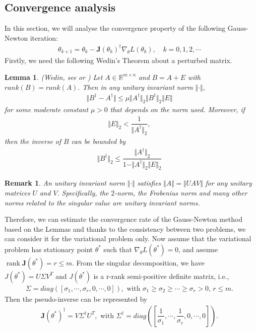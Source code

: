 \documentclass[a4paper, 11pt]{article}
\numberwithin{equation}{section}
\newtheorem{lemma}{\textbf{Lemma}}
\newtheorem{remark}{\textbf{Remark}}
\begin{document}
\subsection{Convergence analysis}
\quad\quad In this section, we will analyse the convergence property of the following Gauss-Newton iteration:
\begin{align}\label{pvarIter}
\theta_{k+1} = \theta_k - \boldsymbol{J} (\theta_k)^{\dagger}  \nabla_{\theta}L(\theta_k), \quad k=0,1,2,\cdots
\end{align}
Firstly, we need the following Wedin's Theorem about a perturbed matrix.

\begin{lemma}\label{lemma5} (Wedin, see \cite{Wedin1973} or \cite{Nieves2016})
Let $A\in \mathbb{R}^{m\times n}$ and $B = A+E$ with $rank(B) = rank(A)$. Then in any unitary invariant norm $\Vert \cdot \Vert$,
\begin{align}\label{lemma5one}
\Vert B^{\dagger} - A^{\dagger} \Vert \leq \mu \Vert A^{\dagger} \Vert_2 \Vert B^{\dagger} \Vert_2 \Vert E \Vert
\end{align}
for some moderate constant $\mu > 0$ that depends on the norm used. Moreover, if
\begin{align}\label{lemma5two}
\Vert E \Vert_2 < \dfrac{1}{\Vert A^{\dagger} \Vert_2},
\end{align} 
then the inverse of $B$ can be bounded by
\begin{align}\label{lemma5three}
\Vert B^{\dagger} \Vert_2 \leq \dfrac{\Vert A^{\dagger} \Vert_2}{1-\Vert A^{\dagger} \Vert_2\Vert E \Vert_2}
\end{align}
\end{lemma}

\begin{remark}
An unitary invariant norm $\Vert \cdot \Vert$ satisfies $\Vert A \Vert = \Vert UAV \Vert$ for any unitary matrices $U$ and $V$. Specifically, the $2$-norm, the Frobenius norm and many other norms related to the singular value are unitary invariant norms.
\end{remark}

Therefore, we can estimate the convergence rate of the Gauss-Newton method based on the Lemmas and thanks to the consistency between two problems, we can consider it for the variational problem only.
Now assume that the variational problem has stationary point $\theta^*$ such that $\nabla_{\theta} L(\theta^*) = 0$, and assume $\operatorname{rank}{\boldsymbol{J} (\theta^*)} = r \leq m $. From the singular decomposition, we have $J(\theta^*) = U \Sigma V^{T}$ and $J(\theta^*)$ is a r-rank semi-positive definite matrix, i.e.,
\begin{align}
\Sigma = diag\left( [\sigma_1,\cdots, \sigma_r, 0,\cdots, 0] \right), \text{ with } \sigma_1 \geq \sigma_2 \geq \cdots \geq \sigma_r >0 \text{, } r\leq m.
\end{align}
Then the pseudo-inverse can be represented by
\begin{align}
\boldsymbol{J} (\theta^*)^{\dagger} = V \Sigma^{\dagger} U^{T}, \text{ with } \Sigma^{\dagger} = diag\left( \left[\dfrac{1}{\sigma_1},\cdots, \dfrac{1}{\sigma_r}, 0,\cdots, 0\right] \right).
\end{align}
\end{document}
